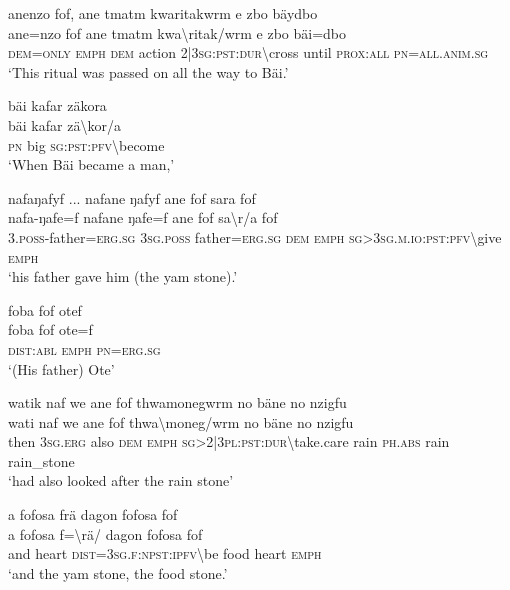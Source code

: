 \newpage
\ea\label{ex:1:a3843}
anenzo fof, ane tmatm kwaritakwrm e zbo bäydbo\\
\gll ane=nzo	fof	ane	tmatm	kwa{\textbackslash}ritak/wrm	e	zbo	bäi=dbo\\
     \textsc{dem}=\textsc{only}	\textsc{emph}	\textsc{dem}	action	2|3\textsc{sg}:\textsc{pst}:\textsc{dur}{\textbackslash}cross	until	\textsc{prox}:\textsc{all}	\textsc{pn}=\textsc{all}.\textsc{anim}.\textsc{sg}\\
\glt `This ritual was passed on all the way to Bäi.'
\z

\ea\label{ex:1:a3844}
bäi kafar zäkora\\
\gll bäi	kafar	zä{\textbackslash}kor/a\\
     \textsc{pn}	big	\textsc{sg}:\textsc{pst}:\textsc{pfv}{\textbackslash}become\\
\glt `When Bäi became a man,'
\z

\ea\label{ex:1:a3845}
nafaŋafyf ... nafane ŋafyf ane fof sara fof\\
\gll nafa-ŋafe=f	nafane	ŋafe=f	ane	fof	sa{\textbackslash}r/a	fof\\
     3.\textsc{poss}-father=\textsc{erg}.\textsc{sg}	3\textsc{sg}.\textsc{poss}	father=\textsc{erg}.\textsc{sg}	\textsc{dem}	\textsc{emph}	\textsc{sg}>3\textsc{sg}.\textsc{m}.\textsc{io}:\textsc{pst}:\textsc{pfv}{\textbackslash}give	\textsc{emph}\\
\glt `his father gave him (the yam stone).'
\z

\ea\label{ex:1:a3846}
foba fof otef\\
\gll foba	fof	ote=f\\
     \textsc{dist}:\textsc{abl}	\textsc{emph}	\textsc{pn}=\textsc{erg}.\textsc{sg}\\
\glt `(His father) Ote'
\z

\ea\label{ex:1:a3847}
watik naf we ane fof thwamonegwrm no bäne no nzigfu\\
\gll wati	naf	we	ane	fof	thwa{\textbackslash}moneg/wrm	no	bäne	no	nzigfu\\
     then	3\textsc{sg}.\textsc{erg}	also	\textsc{dem}	\textsc{emph}	\textsc{sg}>2|3\textsc{pl}:\textsc{pst}:\textsc{dur}{\textbackslash}take.care	rain	\textsc{ph}.\textsc{abs}	rain	rain\_stone\\
\glt `had also looked after the rain stone'
\z

\ea\label{ex:1:a3849}
a fofosa frä dagon fofosa fof\\
\gll a	fofosa	f={\textbackslash}rä/	dagon	fofosa	fof\\
     and	heart	\textsc{dist}=3\textsc{sg}.\textsc{f}:\textsc{npst}:\textsc{ipfv}{\textbackslash}be	food	heart	\textsc{emph}\\
\glt `and the yam stone, the food stone.'
\z

